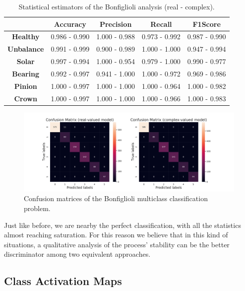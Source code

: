 \documentclass[../main.tex]{subfiles}
\begin{document}
\begin{table}[ht]
	\centering
	\begin{tabular}{c | c c c c}
		\toprule
		 & \textbf{Accuracy} & \textbf{Precision} & \textbf{Recall} & \textbf{F1Score} \\
		 \midrule
		\textbf{Healthy}   & 0.986 - 0.990 & 1.000 - 0.988 & 0.973 - 0.992 & 0.987 - 0.990\\
		\textbf{Unbalance} & 0.991 - 0.999 & 0.900 - 0.989 & 1.000 - 1.000 & 0.947 - 0.994\\
		\textbf{Solar}     & 0.997 - 0.994 & 1.000 - 0.954 & 0.979 - 1.000 & 0.990 - 0.977\\
		\textbf{Bearing}   & 0.992 - 0.997 & 0.941 - 1.000 & 1.000 - 0.972 & 0.969 - 0.986\\
		\textbf{Pinion}    & 1.000 - 0.997 & 1.000 - 1.000 & 1.000 - 0.964 & 1.000 - 0.982\\
		\textbf{Crown}     & 1.000 - 0.997 & 1.000 - 1.000 & 1.000 - 0.966 & 1.000 - 0.983\\
		\bottomrule	
	\end{tabular}
	\caption{Statistical estimators of the Bonfiglioli analysis (real - complex).}
\end{table}
\begin{figure}[ht]
	\centering
	\includegraphics[width=\textwidth]{pictures/bonfiglioli_onecycle_confmat}
	\caption{Confusion matrices of the Bonfiglioli multiclass classification problem.}
	\label{fig:bonfiglioli_onecycle_confmat}
\end{figure}
Just like before, we are nearby the perfect classification, with all the statistics almost reaching saturation. For this reason we believe that in this kind of situations, a qualitative analysis of the process' stability can be the better discriminator among two equivalent approaches.

\subsection{Class Activation Maps}
\end{document}
